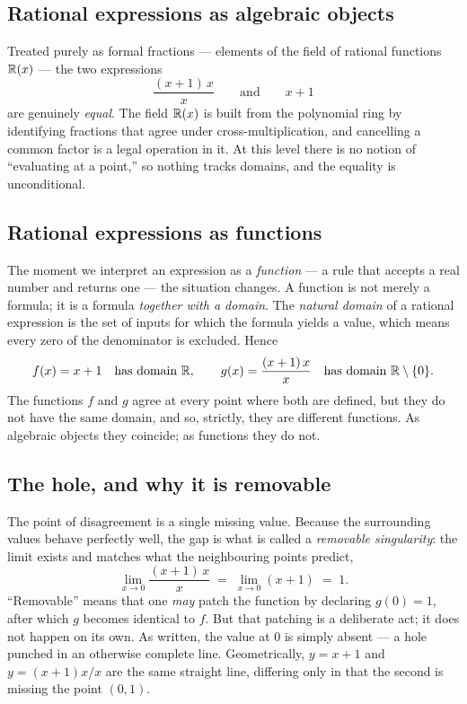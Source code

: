\documentclass{essay}
\begin{document}
\subsection{Rational expressions as algebraic objects}

Treated purely as formal fractions --- elements of the field of rational functions
\(\mathbb{R}(x)\) --- the two expressions
\[ \frac{(x+1)\,x}{x} \qquad\text{and}\qquad x+1 \]
are genuinely \emph{equal}. The field \(\mathbb{R}(x)\) is built from the polynomial ring by
identifying fractions that agree under cross-multiplication, and cancelling a common factor
is a legal operation in it. At this level there is no notion of ``evaluating at a point,''
so nothing tracks domains, and the equality is unconditional.

\subsection{Rational expressions as functions}

The moment we interpret an expression as a \emph{function} --- a rule that accepts a real
number and returns one --- the situation changes. A function is not merely a formula; it is
a formula \emph{together with a domain}. The \emph{natural domain} of a rational expression
is the set of inputs for which the formula yields a value, which means every zero of the
denominator is excluded. Hence
\[ f(x) = x+1 \quad\text{has domain } \mathbb{R}, \qquad g(x) = \frac{(x+1)\,x}{x} \quad\text{has domain } \mathbb{R}\setminus\{0\}. \]
The functions \(f\) and \(g\) agree at every point where both are defined, but they do not have
the same domain, and so, strictly, they are different functions. As algebraic objects they
coincide; as functions they do not.

\subsection{The hole, and why it is removable}

The point of disagreement is a single missing value. Because the surrounding values behave
perfectly well, the gap is what is called a \emph{removable singularity}: the limit exists
and matches what the neighbouring points predict,
\[ \lim_{x \to 0} \frac{(x+1)\,x}{x} \;=\; \lim_{x \to 0}(x+1) \;=\; 1. \]
``Removable'' means that one \emph{may} patch the function by declaring \(g(0) = 1\), after
which \(g\) becomes identical to \(f\). But that patching is a deliberate act; it does not
happen on its own. As written, the value at \(0\) is simply absent --- a hole punched in an
otherwise complete line. Geometrically, \(y = x+1\) and \(y = (x+1)x/x\) are the same straight
line, differing only in that the second is missing the point \((0,1)\).
\end{document}
